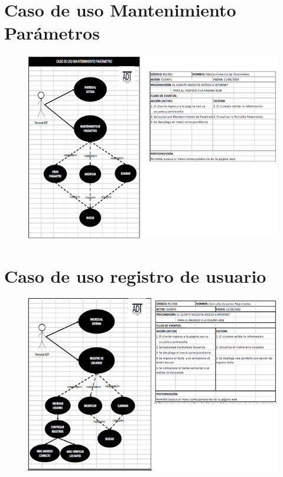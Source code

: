 \documentclass[12pt,a4paper]{article}
\begin{document}
\section*{Caso de uso Mantenimiento Parámetros}
\begin{figure}[hbtp]
\caption{}
\centering
\includegraphics[scale=0.5]{SEXTA.png}
\end{figure}


\section*{Caso de uso registro de usuario}
\begin{figure}[hbtp]
\caption{}
\centering
\includegraphics[scale=0.5]{SEPTIMA.png}
\end{figure}
\end{document}
